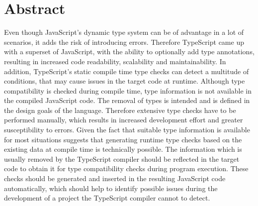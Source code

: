 \chapter{Abstract}


Even though JavaScript's dynamic type system can be of advantage in a lot of scenarios, it adds the risk of introducing errors. Therefore TypeScript came up with a superset of JavaScript, with the ability to optionally add type annotations, resulting in increased code readability, scalability and maintainability. In addition, TypeScript's static compile time type checks can detect a multitude of conditions, that may cause issues in the target code at runtime. Although type compatibility is checked during compile time, type information is not available in the compiled JavaScript code. The removal of types is intended and is defined in the design goals of the language. Therefore extensive type checks have to be performed manually, which results in increased development effort and greater susceptibility to errors. Given the fact that suitable type information is available for most situations suggests that generating runtime type checks based on the existing data at compile time is technically possible. The information which is usually removed by the TypeScript compiler should be reflected in the target code to obtain it for type compatibility checks during program execution. These checks should be generated and inserted in the resulting JavaScript code automatically, which should help to identify possible issues during the development of a project the TypeScript compiler cannot to detect.